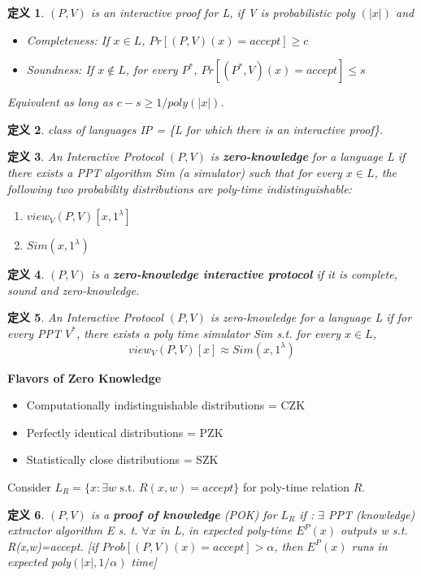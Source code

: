 \documentclass[10pt]{ctexart}
\newtheorem{definition}{定义}
\begin{document}
\begin{definition}
	$(P, V)$ is an interactive proof for L, if V is probabilistic poly $(|x|)$ and 
	\begin{itemize}
		\item Completeness: If $x\in L$, $Pr[(P,V)(x)= accept] \ge c$
		\item Soundness: If $x \notin L$, for every $P^*$, $Pr[(P^*,V)(x)= accept] \le s$
	\end{itemize}
	Equivalent as long as $ c-s \ge 1/poly(|x|)$.
\end{definition}

\begin{definition}
	class of languages IP =
\{L for which there is an interactive proof\}.
\end{definition}

\begin{definition}
	An Interactive Protocol $(P,V)$ is \textbf{zero-knowledge} for a language L if there exists a PPT algorithm Sim (a simulator) such that for every $x \in L$, the following two probability distributions are poly-time indistinguishable:
	\begin{enumerate}
		\item $view_V(P,V)[x, 1^\lambda]$
		\item $Sim(x, 1^\lambda)$
	\end{enumerate}
\end{definition}
\begin{definition}
	$(P,V)$ is a \textbf{zero-knowledge interactive protocol} if it is complete, sound and zero-knowledge.
\end{definition}

\begin{definition}
	An Interactive Protocol $(P,V)$ is zero-knowledge for a language L if for every PPT $V^*$, there exists a poly time simulator Sim s.t. for every $x \in L$,
	$$
	view_V(P,V)[x] \approx Sim(x,1^\lambda)
	$$
\end{definition}

\textbf{Flavors of Zero Knowledge}
\begin{itemize}
	\item Computationally indistinguishable distributions = CZK
	\item Perfectly identical distributions = PZK
	\item Statistically close distributions = SZK
\end{itemize}

Consider $L_R=\{x: \exists w \text{ s.t. }  R(x,w)= accept \}$ for poly-time relation $R$.
\begin{definition}
	$(P,V)$ is a \textbf{proof of knowledge} (POK) for $L_R$ if :
	$\exists$ PPT (knowledge) extractor algorithm E s. t. $\forall x$ in L,
	in expected poly-time $E^P(x)$ outputs w s.t. R(x,w)=accept. {\color{blue}[if $Prob[(P,V)(x)=accept] > \alpha$, then $E^P(x)$ runs in expected poly$(|x|,1/ \alpha)$ time]}
\end{definition}
\end{document}
